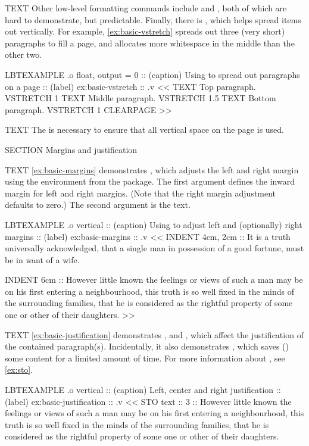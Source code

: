 \begin{lbt}
    TEXT Other low-level formatting commands include  and , both of which are hard to demonstrate, but predictable. Finally, there is , which helps spread items out vertically. For example, \cref{ex:basic-vstretch} spreads out three (very short) paragraphs to fill a page, and allocates more whitespace in the middle than the other two.

    LBTEXAMPLE .o float, output = 0
    :: (caption) Using  to spread out paragraphs on a page
    :: (label) ex:basic-vstretch
    :: .v <<
      TEXT Top paragraph.
      VSTRETCH 1
      TEXT Middle paragraph.
      VSTRETCH 1.5
      TEXT Bottom paragraph.
      VSTRETCH 1
      CLEARPAGE
    >>

    TEXT The  is necessary to ensure that all vertical space on the page is used.





    SECTION Margins and justification

    TEXT \cref{ex:basic-margins} demonstrates , which adjusts the left and right margin using the  environment from the  package. The first argument defines the inward margin for left and right margins. (Note that the right margin adjustment defaults to zero.) The second argument is the text.

    LBTEXAMPLE .o vertical
    :: (caption) Using  to adjust left and (optionally) right margins
    :: (label) ex:basic-margins
    :: .v <<
      INDENT 4cm, 2cm :: It is a truth universally acknowledged, that a single man in possession of a good fortune, must be in want of a wife.

      INDENT 6cm :: However little known the feelings or views of such a man may be on his first entering a neighbourhood, this truth is so well fixed in the minds of the surrounding families, that he is considered as the rightful property of some one or other of their daughters.
    >>

    TEXT \cref{ex:basic-justification} demonstrates ,  and , which affect the justification of the contained paragraph(s). Incidentally, it also demonstrates , which saves () some content for a limited amount of time. For more information about , see \cref{ex:sto}.

    LBTEXAMPLE .o vertical
    :: (caption) Left, center and right justification
    :: (label) ex:basic-justification
    :: .v <<
      STO text :: 3 :: However little known the feelings or views of such a man may be on his first entering a neighbourhood, this truth is so well fixed in the minds of the surrounding families, that he is considered as the rightful property of some one or other of their daughters.


\end{lbt}
